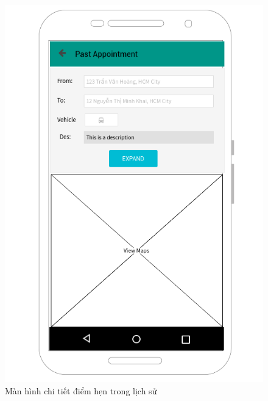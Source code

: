 \documentclass[a4paper]{article}
\begin{document}
\begin{figure}[h]
    \includegraphics[scale=0.6]{Mockup/HI_pastappointment}
    \centering
    \caption{Màn hình chi tiết điểm hẹn trong lịch sử}
    \label{fig:HI_pastappointment}
\end{figure}
\clearpage
\end{document}

